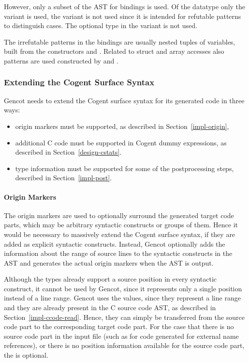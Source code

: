 However, only a subset of the AST for bindings is used. Of the datatype  only the variant
 is used, the variant  is not used since it is intended for refutable patterns
to distinguish cases. The optional type in the  variant is not used.

The irrefutable patterns in the bindings are usually nested tuples of variables, built from the constructors
 and . Related to struct and array accesses also  patterns are used constructed
by  and .

\subsubsection{Extending the Cogent Surface Syntax}

Gencot needs to extend the Cogent surface syntax for its generated code in three ways:
\begin{itemize}
\item origin markers must be supported, as described in Section~\ref{impl-origin},
\item additional C code must be supported in Cogent dummy expressions, as described in Section~\ref{design-cstats}.
\item type information must be supported for some of the postprocessing steps, described in Section~\ref{impl-post}.
\end{itemize}

\paragraph{Origin Markers}

The origin markers are used to optionally surround the generated target code parts, which may be arbitrary syntactic constructs
or groups of them. Hence it would be necessary to massively extend the Cogent surface syntax, if they are added as explicit 
syntactic constructs. Instead, Gencot optionally adds the information about the range of source lines to the syntactic
constructs in the AST and generates the actual origin markers when the AST is output. 

Although the  types already support a source position in every syntactic construct, it cannot be used by Gencot,
since it represents only a single position instead of a line range. Gencot uses the  values, since they represent
a line range and they are already present in the C source code AST, as described in Section~\ref{impl-ccode-read}. Hence, they
can simply be transferred from the source code part to the corresponding target code part. For the case that there is no
source code part in the input file (such as for code generated for external name references), or there is no position 
information available for the source code part, the  is optional.

